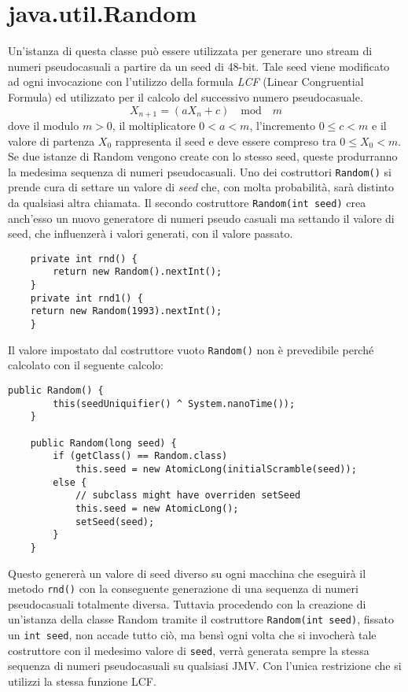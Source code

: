 	\section{java.util.Random}
		Un'istanza di questa classe può essere utilizzata per generare uno stream di numeri pseudocasuali a partire da un seed di 48-bit. Tale seed viene modificato ad ogni invocazione con l'utilizzo della formula \textit{LCF} (Linear Congruential Formula) ed utilizzato per il calcolo del successivo numero pseudocasuale. 
		\[ X_{n+1} = (aX_n + c) \quad \text{mod} \quad m\]
		dove il modulo $m > 0$, il moltiplicatore $0 < a < m$, l'incremento $0 \leq c < m$ e il valore di partenza $X_0$ rappresenta il seed e deve essere compreso tra $0 \leq X_0 < m$.
		Se due istanze di Random vengono create con lo stesso seed, queste produrranno la medesima sequenza di numeri pseudocasuali. Uno dei costruttori \lstinline|Random()| si prende cura di settare un valore di \textit{seed} che, con molta probabilità, sarà distinto da qualsiasi altra chiamata. Il secondo costruttore \lstinline|Random(int seed)| crea anch'esso un nuovo generatore di numeri pseudo casuali ma settando il valore di seed, che influenzerà i valori generati, con il valore passato. 
		\begin{lstlisting}
	private int rnd() {
		return new Random().nextInt(); 
	}
	private int rnd1() {
	return new Random(1993).nextInt(); 
	}  
		\end{lstlisting}
		Il valore impostato dal costruttore vuoto \lstinline|Random()| non è prevedibile perché calcolato con il seguente calcolo:
		\begin{lstlisting}[numbers=none,frame=none]
	public Random() {
		this(seedUniquifier() ^ System.nanoTime());
	}
	
	public Random(long seed) {
		if (getClass() == Random.class)
			this.seed = new AtomicLong(initialScramble(seed));
		else {
			// subclass might have overriden setSeed
			this.seed = new AtomicLong();
			setSeed(seed);
		}
	}
		\end{lstlisting}
		Questo genererà un valore di seed diverso su ogni macchina che eseguirà il metodo \lstinline|rnd()| con la conseguente generazione di una sequenza di numeri pseudocasuali totalmente diversa. Tuttavia procedendo con la creazione di un'istanza della classe Random tramite il costruttore \lstinline|Random(int seed)|, fissato un \lstinline|int seed|, non accade tutto ciò, ma bensì ogni volta che si invocherà tale costruttore con il medesimo valore di \lstinline|seed|, verrà generata sempre la stessa sequenza di numeri pseudocasuali su qualsiasi JMV. Con l'unica restrizione che si utilizzi la stessa funzione LCF. 
